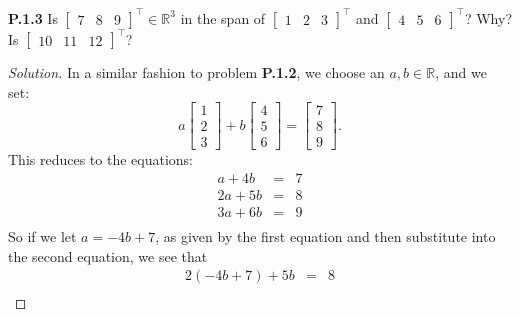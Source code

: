 \documentclass[12pt]{amsart}
\newenvironment{solution}
{\begin{proof}[Solution]}
{\end{proof}}
\begin{document}
\begin{onehalfspace}
        \noindent\textbf{P.1.3} Is $[\begin{matrix}7 & 8 & 9\end{matrix}]^\top \in\mathbb{R}^3$ in the span of
        $[\begin{matrix}1 & 2 & 3\end{matrix}]^\top$ and $[\begin{matrix}4 & 5 & 6\end{matrix}]^\top$? Why? Is
        $[\begin{matrix}10 & 11 & 12\end{matrix}]^\top$?
        \begin{solution}
            In a similar fashion to problem \textbf{P.1.2}, we choose an $a,b\in\mathbb{R}$, and we set:
            \begin{displaymath}
                a\left[\begin{matrix}
                           1 \\
                           2 \\
                           3
                \end{matrix}\right] +
                b\left[\begin{matrix}
                           4 \\
                           5 \\
                           6
                \end{matrix}\right] =
                \left[\begin{matrix}
                          7 \\
                          8 \\
                          9
                \end{matrix}\right].
            \end{displaymath}
            This reduces to the equations:
            \begin{eqnarray*}
                a + 4b & = & 7\\
                2a + 5b & = & 8 \\
                3a + 6b & = & 9 \\
            \end{eqnarray*}
            So if we let $a = -4b + 7$, as given by the first equation and then substitute into the second equation,
            we see that
            \begin{eqnarray*}
                2(-4b + 7) + 5b & = & 8 \\

\end{eqnarray*}
\end{solution}
\end{onehalfspace}
\end{document}
